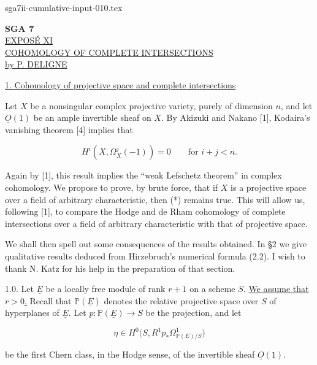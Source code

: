 \begin{filecontents*}{sga7ii-cumulative-input-010.tex}
\clearpage
\begin{center}
{\large\textbf{SGA 7}}\\[1.5em]
{\Large\underline{EXPOSÉ XI}}\\[2.5em]
{\Large\underline{COHOMOLOGY OF COMPLETE INTERSECTIONS}}\\[1.5em]
{\large\underline{by P. DELIGNE}}
\end{center}

\bigskip
\noindent\underline{1. Cohomology of projective space and complete
intersections}

Let $X$ be a nonsingular complex projective variety, purely of dimension $n$,
and let $\underline O(1)$ be an ample invertible sheaf on $X$.  By Akizuki and
Nakano [1], Kodaira's vanishing theorem [4] implies that

\begin{equation}\tag{*}
H^i(X,\Omega_X^j(-1))=0\qquad\text{for }i+j<n.
\end{equation}

Again by [1], this result implies the ``weak Lefschetz theorem'' in complex
cohomology.  We propose to prove, by brute force, that if $X$ is a projective
space over a field of arbitrary characteristic, then (*) remains true.  This
will allow us, following [1], to compare the Hodge and de Rham cohomology of
complete intersections over a field of arbitrary characteristic with that of
projective space.

We shall then spell out some consequences of the results obtained.  In §2 we
give qualitative results deduced from Hirzebruch's numerical formula (2.2).  I
wish to thank N. Katz for his help in the preparation of that section.

1.0. Let $\underline E$ be a locally free module of rank $r+1$ on a scheme
$S$.  \underline{We assume that $r>0$.}  Recall that
$\mathbb P(\underline E)$ denotes the relative projective space over $S$ of
hyperplanes of $\underline E$.  Let $p:\mathbb P(\underline E)\to S$ be the
projection, and let

\begin{equation*}
\eta\in H^0\bigl(S,R^1p_*\Omega^1_{\mathbb P(\underline E)/S}\bigr)
\end{equation*}

be the first Chern class, in the Hodge sense, of the invertible sheaf
$\underline O(1)$.



\end{filecontents*}
